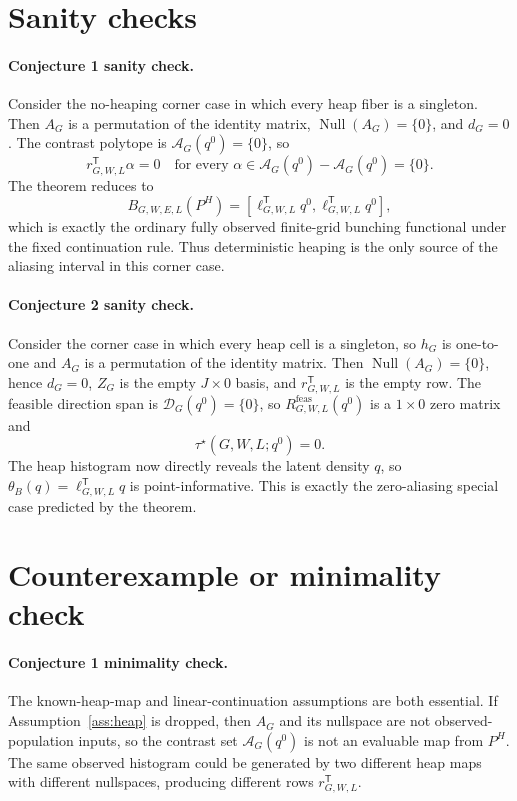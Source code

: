 \documentclass[11pt]{article}
\newcommand{\transpose}{\mathsf{T}}
\theoremstyle{definition}
\theoremstyle{plain}
\theoremstyle{remark}
\begin{document}
\section{Sanity checks}
\paragraph{Conjecture 1 sanity check.}
Consider the no-heaping corner case in which every heap fiber is a singleton.  Then \(A_G\) is a permutation of the identity matrix, \(\operatorname{Null}(A_G)=\{0\}\), and \(d_G=0\).  The contrast polytope is \(\mathcal{A}_G(q^0)=\{0\}\), so
\[
r_{G,W,L}^{\transpose}\alpha=0
\quad\text{for every }\alpha\in\mathcal{A}_G(q^0)-\mathcal{A}_G(q^0)=\{0\}.
\]
The theorem reduces to
\[
B_{G,W,E,L}(P^H)=\left[\ell_{G,W,L}^{\transpose}q^0,\ell_{G,W,L}^{\transpose}q^0\right],
\]
which is exactly the ordinary fully observed finite-grid bunching functional under the fixed continuation rule.  Thus deterministic heaping is the only source of the aliasing interval in this corner case.

\paragraph{Conjecture 2 sanity check.}
Consider the corner case in which every heap cell is a singleton, so \(h_G\) is one-to-one and \(A_G\) is a permutation of the identity matrix.  Then \(\operatorname{Null}(A_G)=\{0\}\), hence \(d_G=0\), \(Z_G\) is the empty \(J\times0\) basis, and \(r_{G,W,L}^{\transpose}\) is the empty row.  The feasible direction span is \(\mathcal{D}_G(q^0)=\{0\}\), so \(R^{\mathrm{feas}}_{G,W,L}(q^0)\) is a \(1\times0\) zero matrix and
\[
\tau^\star(G,W,L;q^0)=0.
\]
The heap histogram now directly reveals the latent density \(q\), so \(\theta_B(q)=\ell_{G,W,L}^{\transpose}q\) is point-informative.  This is exactly the zero-aliasing special case predicted by the theorem.

\section{Counterexample or minimality check}
\paragraph{Conjecture 1 minimality check.}
The known-heap-map and linear-continuation assumptions are both essential.  If Assumption~\ref{ass:heap} is dropped, then \(A_G\) and its nullspace are not observed-population inputs, so the contrast set \(\mathcal{A}_G(q^0)\) is not an evaluable map from \(P^H\).  The same observed histogram could be generated by two different heap maps with different nullspaces, producing different rows \(r_{G,W,L}^{\transpose}\).
\end{document}
